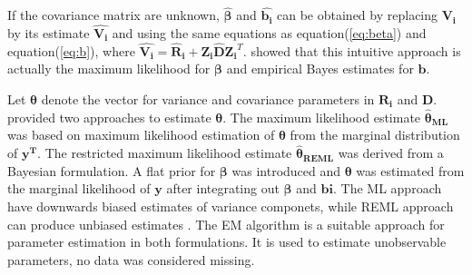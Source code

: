 \documentclass{article}
\numberwithin{equation}{section}
\begin{document}
If the covariance matrix are unknown, $\hat{\bm{\beta}}$ and $\hat{\bm{b_i}}$ can be obtained by replacing $\bm{V_i}$ by its estimate $\hat{\bm{V_i}}$ and using the same equations as equation(\ref{eq:beta}) and equation(\ref{eq:b}), where $\hat{\bm{V_i}}= \bm{\hat{R}_i}+\bm{Z_i}\bm{\hat{D}}\bm{Z_i}^T$. \cite{laird1982random} showed that this intuitive approach is actually the maximum likelihood for $\bm{\beta}$ and empirical Bayes estimates for $\bm{b}$. 

Let $\bm{\theta}$ denote the vector for variance and covariance parameters in $\bm{R_i}$ and $\bm{D}$. \cite{laird1982random} provided two approaches to estimate $\bm{\theta}$. The maximum likelihood estimate $\bm{\hat{\theta}_{ML}}$ was based on maximum likelihood estimation of $\bm{\theta}$ from the marginal distribution of $\bm{y^T}$. The restricted maximum likelihood estimate $\bm{\hat{\theta}_{REML}}$ was derived from a Bayesian formulation. A flat prior for $\bm{\beta}$ was introduced and $\bm{\theta}$ was estimated from the marginal likelihood of $\bm{y}$ after integrating out $\bm{\beta}$ and $\bm{bi}$. The ML approach have downwards biased estimates of variance componets, while REML approach can produce unbiased estimates \cite{laird1982random}. The EM algorithm \cite{dempster1977maximum} is a suitable approach for parameter estimation in both formulations. It is used to estimate unobservable parameters, no data was considered missing.
\end{document}
